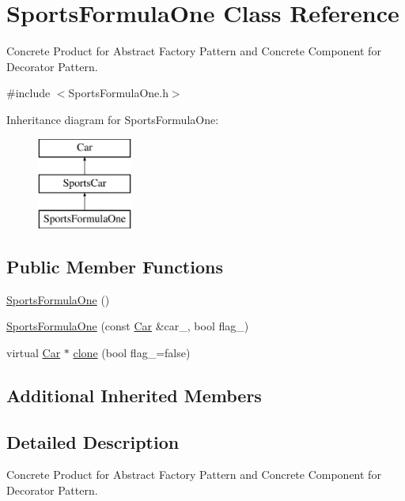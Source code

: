 \hypertarget{class_sports_formula_one}{}\section{Sports\+Formula\+One Class Reference}
\label{class_sports_formula_one}


Concrete Product for Abstract Factory Pattern and Concrete Component for Decorator Pattern.  




{\ttfamily \#include $<$Sports\+Formula\+One.\+h$>$}

Inheritance diagram for Sports\+Formula\+One\+:\begin{figure}[H]
\begin{center}
\leavevmode
\includegraphics[height=3.000000cm]{class_sports_formula_one}
\end{center}
\end{figure}
\subsection*{Public Member Functions}
\begin{DoxyCompactItemize}
\item 
\mbox{\hyperlink{class_sports_formula_one_aad78fa26995b5d94452fac1c2f86bf09}{Sports\+Formula\+One}} ()
\item 
\mbox{\hyperlink{class_sports_formula_one_a4b89c4741faa5b5ecfcda5c81fc86a37}{Sports\+Formula\+One}} (const \mbox{\hyperlink{class_car}{Car}} \&car\+\_\+, bool flag\+\_\+)
\item 
virtual \mbox{\hyperlink{class_car}{Car}} $\ast$ \mbox{\hyperlink{class_sports_formula_one_aba368f668094ef50d94c29acd739fcbe}{clone}} (bool flag\+\_\+=false)
\end{DoxyCompactItemize}
\subsection*{Additional Inherited Members}


\subsection{Detailed Description}
Concrete Product for Abstract Factory Pattern and Concrete Component for Decorator Pattern. 

